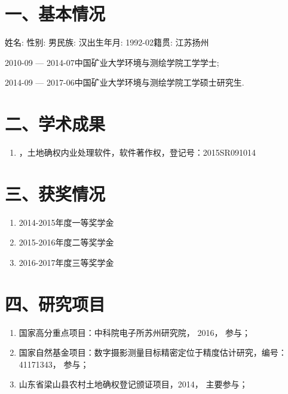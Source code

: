 \begin{resume}

\section*{一、基本情况}


姓名: \zuozhe\quad 性别: 男\quad 民族: 汉\quad 出生年月: 1992-02\quad 籍贯: 江苏扬州

2010-09 --- 2014-07\quad  中国矿业大学环境与测绘学院工学学士;

2014-09 --- 2017-06\quad  中国矿业大学环境与测绘学院工学硕士研究生.

\section*{二、学术成果}

\begin{enumerate}
  \item \zuozhe，土地确权内业处理软件，软件著作权，登记号：2015SR091014
\end{enumerate}


\section*{三、获奖情况}
\begin{enumerate}
  \item 2014-2015年度\quad 一等奖学金
  \item 2015-2016年度\quad 二等奖学金
  \item 2016-2017年度\quad 三等奖学金
\end{enumerate}
\section*{四、研究项目}
\begin{enumerate}
  \item 国家高分重点项目：中科院电子所苏州研究院， 2016， 参与；
  \item 国家自然基金项目：数字摄影测量目标精密定位于精度估计研究，编号：41171343， 参与；
  \item 山东省梁山县农村土地确权登记颁证项目，2014， 主要参与；
\end{enumerate}

\end{resume}